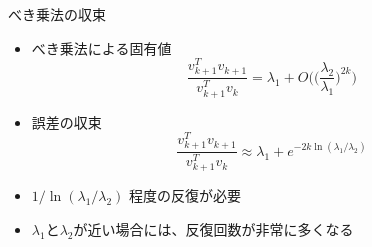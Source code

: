 \begin{frame}[t,fragile]{べき乗法の収束}
  \begin{itemize}
    \setlength{\itemsep}{1em}
  \item べき乗法による固有値
    \[
    \frac{v_{k+1}^T v_{k+1}}{v_{k+1}^T v_k} = \lambda_1 + O\Big( \big(\frac{\lambda_2}{\lambda_1} \big)^{2k}\Big)
    \]
  \item 誤差の収束
    \[
    \frac{v_{k+1}^T v_{k+1}}{v_{k+1}^T v_k} \approx \lambda_1 + e^{-2k \ln (\lambda_1/\lambda_2)}
    \]
  \item $1 / \ln (\lambda_1/\lambda_2)$ 程度の反復が必要
  \item $\lambda_1$と$\lambda_2$が近い場合には、反復回数が非常に多くなる
  \end{itemize}
\end{frame}
